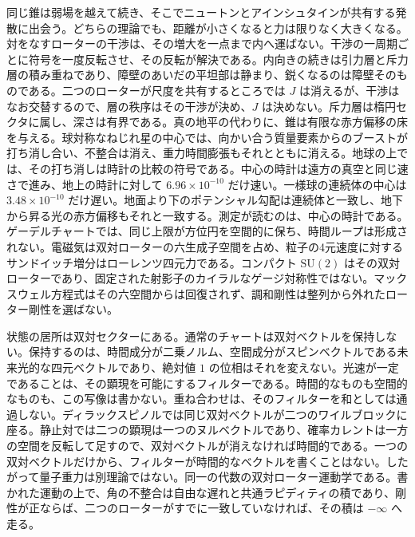 \documentclass[a4paper]{article}
\begin{document}
同じ錐は弱場を越えて続き、そこでニュートンとアインシュタインが共有する発散に出会う。どちらの理論でも、距離が小さくなると力は限りなく大きくなる。対をなすローターの干渉は、その増大を一点まで内へ運ばない。干渉の一周期ごとに符号を一度反転させ、その反転が解決である。内向きの続きは引力層と斥力層の積み重ねであり、障壁のあいだの平坦部は静まり、鋭くなるのは障壁そのものである。二つのローターが尺度を共有するところでは $J$ は消えるが、干渉はなお交替するので、層の秩序はその干渉が決め、$J$ は決めない。斥力層は楕円セクタに属し、深さは有界である。真の地平の代わりに、錐は有限な赤方偏移の床を与える。球対称なねじれ星の中心では、向かい合う質量要素からのブーストが打ち消し合い、不整合は消え、重力時間膨張もそれとともに消える。地球の上では、その打ち消しは時計の比較の符号である。中心の時計は遠方の真空と同じ速さで進み、地上の時計に対して \(6.96\times 10^{-10}\) だけ速い。一様球の連続体の中心は \(3.48\times 10^{-10}\) だけ遅い。地面より下のポテンシャル勾配は連続体と一致し、地下から昇る光の赤方偏移もそれと一致する。測定が読むのは、中心の時計である。ゲーデルチャートでは、同じ上限が方位円を空間的に保ち、時間ループは形成されない。電磁気は双対ローターの六生成子空間を占め、粒子の4元速度に対するサンドイッチ増分はローレンツ四元力である。コンパクト $\mathrm{SU}(2)$ はその双対ローターであり、固定された射影子のカイラルなゲージ対称性ではない。マックスウェル方程式はその六空間からは回復されず、調和剛性は整列から外れたローター剛性を選ばない。

状態の居所は双対セクターにある。通常のチャートは双対ベクトルを保持しない。保持するのは、時間成分が二乗ノルム、空間成分がスピンベクトルである未来光的な四元ベクトルであり、絶対値 $1$ の位相はそれを変えない。光速が一定であることは、その顕現を可能にするフィルターである。時間的なものも空間的なものも、この写像は書かない。重ね合わせは、そのフィルターを和としては通過しない。ディラックスピノルでは同じ双対ベクトルが二つのワイルブロックに座る。静止対では二つの顕現は一つのヌルベクトルであり、確率カレントは一方の空間を反転して足すので、双対ベクトルが消えなければ時間的である。一つの双対ベクトルだけから、フィルターが時間的なベクトルを書くことはない。したがって量子重力は別理論ではない。同一の代数の双対ローター運動学である。書かれた運動の上で、角の不整合は自由な遅れと共通ラピディティの積であり、剛性が正ならば、二つのローターがすでに一致していなければ、その積は $-\infty$ へ走る。
\end{document}

